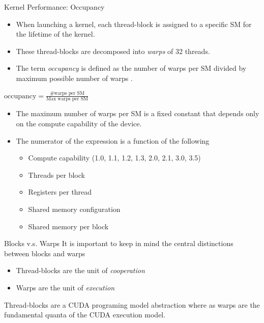 \documentclass[handout]{beamer}
\begin{document}
\begin{frame}{Kernel Performance: Occupancy}
\begin{itemize}
	\item<1->When launching a kernel, each thread-block is assigned to a specific SM for the lifetime of the kernel.  
	\item<1->These thread-blocks are decomposed into \emph{warps} of 32 threads.
	\item<1->The term \emph{occupancy} is defined as the number of warps per SM divided by maximum possible number of warps .
\end{itemize}
\begin{center}
$\text{occupancy} =\frac{\text{\# warps per SM}}{\text{Max warps per SM}}$
\end{center}

\begin{itemize}
	\item<1->The maximum number of warps per SM is a fixed constant that depends only on the compute capability of the device.
        \item<1->The numerator of the expression is a function of the following
        \begin{itemize}
        		\item<1->Compute capability (1.0, 1.1, 1.2, 1.3, 2.0, 2.1, 3.0, 3.5)
		\item<1->Threads per block
		\item<1->Registers per thread
		\item<1->Shared memory configuration
		\item<1->Shared memory per block
        \end{itemize} 
\end{itemize}
\end{frame}

\begin{frame}{Blocks v.s. Warps}
It is important to keep in mind the central distinctions between blocks and warps
\hfill\break
\begin{itemize}
\itemsep1em
	\item<1->Thread-blocks are the unit of \emph{cooperation}
	\item<1->Warps are the unit of \emph{execution}
\end{itemize}
\hfill\break
Thread-blocks are a CUDA programing model abstraction where as warps are the fundamental quanta of the CUDA execution model.
\end{frame}
\end{document}
